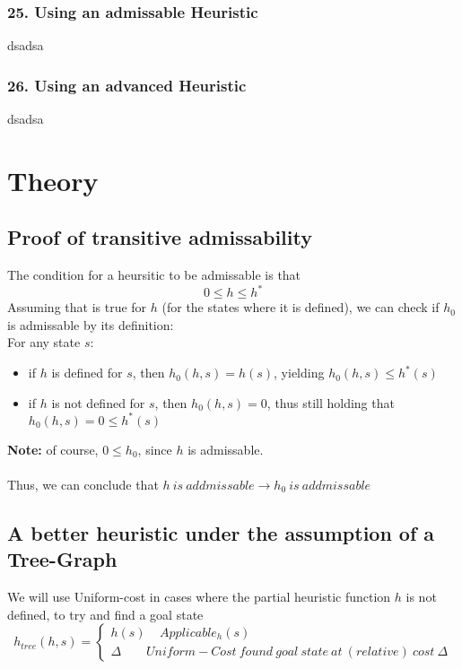 \documentclass{article}
\begin{document}
\subsubsection*{25. Using an admissable Heuristic}
dsadsa

\subsubsection*{26. Using an advanced Heuristic}
dsadsa

\section*{Theory}
\subsection*{Proof of transitive admissability}
The condition for a heursitic to be admissable is that 
$$ 0 \leq h \leq h^* $$
Assuming that is true for $h$ (for the states where it is defined), we can check if $h_0$ is admissable by its definition: \\ 
For any state $s$:
\begin{itemize}
\item if $h$ is defined for $s$, then $h_0(h,s) = h(s)$, yielding $h_0(h,s) \leq h^*(s) $
\item if $h$ is not defined for $s$, then $h_0(h,s) = 0$, thus still holding that $  h_0(h,s) = 0 \leq h^*(s) $
\end{itemize}

\textbf{Note: } of course, $0 \leq h_0$, since $h$ is admissable. \\ \\

Thus, we can conclude that $ h\ is\ addmissable \rightarrow h_0\ is\ addmissable $

\subsection*{A better heuristic under the assumption of a Tree-Graph}
We will use Uniform-cost in cases where the partial heuristic function $h$ is not defined, to try and find a goal state
\[
  h_{tree}(h,s)=\begin{cases}
               h(s) \ \ \ \ \  Applicable_h(s) \\
               \Delta \ \ \ \ \ \ \ \  \  Uniform-Cost\ found\ goal\ state\ at\ (relative)\ cost\ \Delta
            \end{cases}
\]
\end{document}
